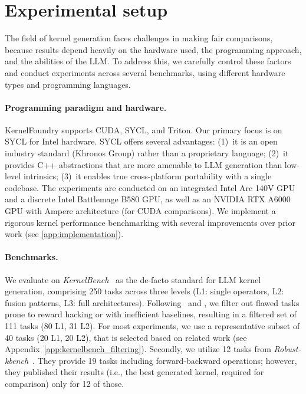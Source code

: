 %
%
%
%

\section{Experimental setup}\label{sec:experiments}

The field of kernel generation faces challenges in making fair comparisons, because results depend heavily on the hardware used, the programming approach, and the abilities of the LLM. To address this, we carefully control these factors and conduct experiments across several benchmarks, using different hardware types and programming languages. 


\paragraph{Programming paradigm and hardware.} 
KernelFoundry supports CUDA, SYCL, and Triton. Our primary focus is on SYCL for Intel hardware. SYCL offers several advantages: (1)~it is an open industry standard (Khronos Group) rather than a proprietary language; (2)~it provides C++ abstractions that 
are more amenable to LLM generation than low-level intrinsics; (3)~it enables true cross-platform portability with a single codebase. The experiments are conducted on an integrated Intel Arc 140V GPU and a discrete Intel Battlemage B580 GPU, as well as an NVIDIA RTX A6000 GPU with Ampere architecture (for CUDA comparisons). We implement a rigorous kernel performance benchmarking with several improvements over prior work (see \autoref{app:implementation}).


\paragraph{Benchmarks.}\label{sec:experimental_benchmarks}
We evaluate on  \textit{KernelBench}~\citep{ouyang2025kernelbench} as the de-facto standard for LLM kernel generation, comprising 250 tasks across three levels (L1: single operators, L2: fusion patterns, L3: full architectures). Following~\citet{lange2025towards} and \citet{metr}, we filter out flawed tasks prone to reward hacking or with inefficient baselines, resulting in a filtered set of 111 tasks (80 L1, 31 L2). For most experiments, we use a representative subset of 40 tasks (20 L1, 20 L2), that is selected based on related work (see Appendix~\ref{app:kernelbench_filtering}).
Secondly, we utilize 12 tasks from \textit{Robust-kbench}~\citep{lange2025towards}. They provide 19 tasks including forward-backward operations; however, they published their results (i.e., the best generated kernel, required for comparison) only for 12 of those.


